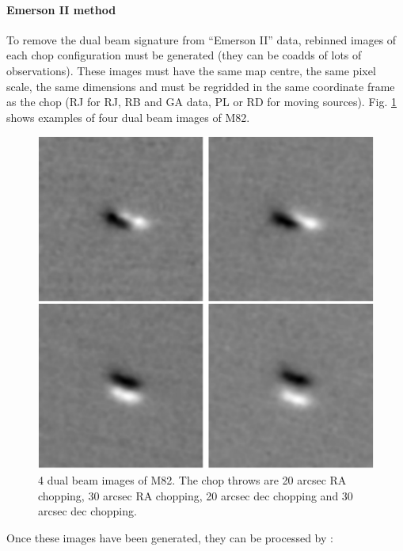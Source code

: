 \documentclass[twoside,11pt]{starlink}
\providecommand{\task}[1]{#1}
\providecommand{\remdbm}{\htmlref{\task{remdbm}}{REMDBM}}
\begin{document}
\paragraph{Emerson II method}

To remove the dual beam signature from ``Emerson II'' data,
rebinned images of each chop configuration must be generated (they can
be coadds of lots of observations). These images must have the same
map centre, the same pixel scale, the same dimensions and must be
regridded in the same coordinate frame as the chop (RJ for RJ, RB and GA
data, PL or RD for moving sources). Fig. \ref{scan:chops} shows examples
of four dual beam images of M82.

\begin{figure}
\begin{center}
\includegraphics[width=\textwidth]{sun216_4chops}
\caption{4 dual beam images of M82. The chop throws are 20 arcsec
RA chopping, 30 arcsec RA chopping, 20 arcsec dec chopping and
30 arcsec dec chopping.
}
\label{scan:chops}
\end{center}
\end{figure}

Once these images have been generated, they can be processed by
\remdbm:
\end{document}
